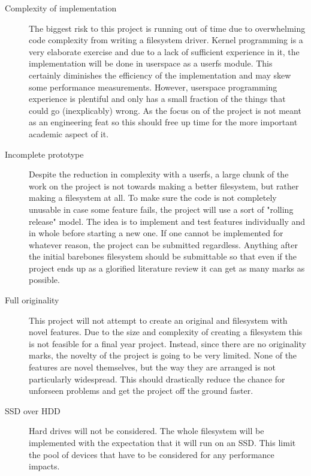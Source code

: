     \begin{description}

        \item[Complexity of implementation] The biggest risk to this project is
            running out of time due to overwhelming code complexity from
            writing a filesystem driver. Kernel programming is a very elaborate
            exercise and due to a lack of sufficient experience in it, the
            implementation will be done in userspace as a userfs module. This
            certainly diminishes the efficiency of the implementation and may
            skew some performance measurements. However, userspace programming
            experience is plentiful and only has a small fraction of the things
            that could go (inexplicably) wrong. As the focus on of the project
            is not meant as an engineering feat so this should free up time for
            the more important academic aspect of it.

        \item[Incomplete prototype] Despite the reduction in complexity with a
            userfs, a large chunk of the work on the project is not towards
            making a better filesystem, but rather making a filesystem at all.
            To make sure the code is not completely unusable in case some
            feature fails, the project will use a sort of "rolling release"
            model. The idea is to implement and test features individually and
            in whole before starting a new one. If one cannot be implemented
            for whatever reason, the project can be submitted regardless.
            Anything after the initial barebones filesystem should be
            submittable so that even if the project ends up as a glorified
            literature review it can get as many marks as possible.

        \item[Full originality] This project will not attempt to create an
            original and filesystem with novel features. Due to the size and
            complexity of creating a filesystem this is not feasible for a
            final year project. Instead, since there are no originality marks,
            the novelty of the project is going to be very limited. None of the
            features are novel themselves, but the way they are arranged is not
            particularly widespread. This should drastically reduce the chance
            for unforseen problems and get the project off the ground faster.

        \item[SSD over HDD] Hard drives will not be considered. The whole
            filesystem will be implemented with the expectation that it will
            run on an SSD. This limit the pool of devices that have to be
            considered for any performance impacts.

    \end{description}

